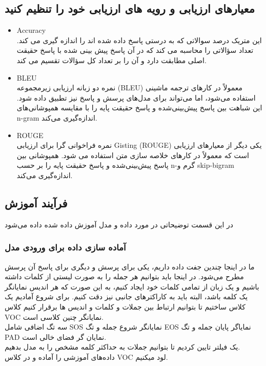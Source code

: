 \subsection{معیارهای ارزیابی و رویه های ارزیابی خود را تنظیم کنید}

\begin{itemize}
    \item Accuracy \\
    این متریک درصد سوالاتی که به درستی پاسخ داده شده اند را اندازه گیری می کند. تعداد سؤالاتی را محاسبه می کند که در آن پاسخ پیش بینی شده با پاسخ حقیقت اصلی مطابقت دارد و آن را بر تعداد کل سؤالات تقسیم می کند.
    \item BLEU\\
    نمره دو زبانه ارزیابی زیرمجموعه (BLEU) معمولاً در کارهای ترجمه ماشینی استفاده می‌شود، اما می‌تواند برای مدل‌های پرسش و پاسخ نیز تطبیق داده شود. این شباهت بین پاسخ پیش‌بینی‌شده و پاسخ حقیقت پایه را با مقایسه همپوشانی‌های n-gram اندازه‌گیری می‌کند.
    \item ROUGE\\
    نمره فراخوانی گرا برای ارزیابی Gisting (ROUGE) یکی دیگر از معیارهای ارزیابی است که معمولاً در کارهای خلاصه سازی متن استفاده می شود. همپوشانی بین پاسخ پیش‌بینی‌شده و پاسخ حقیقت پایه را بر حسب n-گرم و skip-bigram اندازه‌گیری می‌کند.

\end{itemize}

\subsection{فرآیند آموزش}
در این قسمت توضیحاتی در مورد داده و مدل آموزش داده شده داده می‌شود
\subsubsection{آماده سازی داده برای ورودی مدل}
ما در اینجا چندین جفت داده داریم، یکی برای پرسش و دیگری برای پاسخ آن پرسش مطرح می‌شود.
در اینجا باید بتوانیم هر جمله را به صورت لیستی از کلمات داشته باشیم و یک زبان از تمامی کلمات خود ایجاد کنیم، به این صورت که هر 
اندیس نمایانگر یک کلمه باشد، البته باید به کاراکترهای جانبی نیز دقت کنیم.
برای شروع آمادیم یک کلاس ساختیم تا بتوانیم ارتباط بین جملات و کلمات و اندیس ها برقرار کنیم
کلاس VOC نمایانگر چنین کلاسی است.\\
سه تگ اضافی شامل SOS نمایانگر شروع جمله و تگ EOS نمایاگر پایان جمله و تگ PAD نمایان گر فضای خالی است.\\

یک فیلتر تایین کردیم تا بتوانیم جملات به حداکثر کلمه مشخص را به مدل بدهیم.\\
داده‌های آموزشی را آماده و در کلاس VOC لود میکنیم.\\

